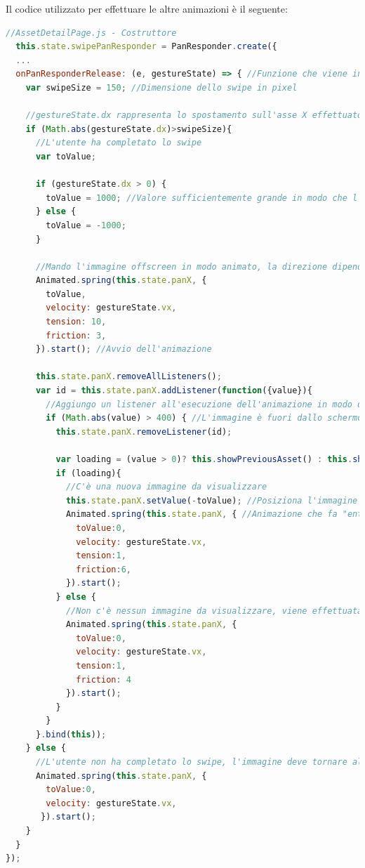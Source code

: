 Il codice utilizzato per effettuare le altre animazioni è il seguente:
\begin{lstlisting}[language=JavaScript, caption=AssetDetailPage - Animazione dello swipe]
//AssetDetailPage.js - Costruttore
  this.state.swipePanResponder = PanResponder.create({
  ...
  onPanResponderRelease: (e, gestureState) => { //Funzione che viene invocata quando l'utente termina la gesture
    var swipeSize = 150; //Dimensione dello swipe in pixel
    
    //gestureState.dx rappresenta lo spostamento sull'asse X effettuato dall'utente
    if (Math.abs(gestureState.dx)>swipeSize){
      //L'utente ha completato lo swipe
      var toValue;
      
      if (gestureState.dx > 0) {
        toValue = 1000; //Valore sufficientemente grande in modo che l'immagine venga renderizzata fuori dallo schermo
      } else {
        toValue = -1000;
      }
     
      //Mando l'immagine offscreen in modo animato, la direzione dipende dalla direzione della gesture (segno di gestureState.dx)
      Animated.spring(this.state.panX, {
        toValue,
        velocity: gestureState.vx,
        tension: 10,
        friction: 3,
      }).start(); //Avvio dell'animazione
      
      this.state.panX.removeAllListeners();
      var id = this.state.panX.addListener(function({value}){ 
      	//Aggiungo un listener all'esecuzione dell'animazione in modo di riuscire a capire quando l'immagine è finita fuori dallo schermo
        if (Math.abs(value) > 400) { //L'immagine è fuori dallo schermo
          this.state.panX.removeListener(id);
          
          var loading = (value > 0)? this.showPreviousAsset() : this.showNextAsset();
          if (loading){
            //C'è una nuova immagine da visualizzare
            this.state.panX.setValue(-toValue); //Posiziona l'immagine dalla parte opposta dello schermo
            Animated.spring(this.state.panX, { //Animazione che fa "entrare" la nuova immagine dalla parte opposta dello schermo
              toValue:0,
              velocity: gestureState.vx,
              tension:1,
              friction:6,
            }).start();
          } else {
          	//Non c'è nessun immagine da visualizzare, viene effettuata l'animazione che riporta l'immagine alla posizione iniziale
            Animated.spring(this.state.panX, {
              toValue:0,
              velocity: gestureState.vx,
              tension:1,
              friction: 4
            }).start();
          }
        }
      }.bind(this));
    } else {
      //L'utente non ha completato lo swipe, l'immagine deve tornare alla posizione iniziale in modo animato
      Animated.spring(this.state.panX, {
        toValue:0,
        velocity: gestureState.vx,
       }).start();
    }
  }
});
\end{lstlisting}

